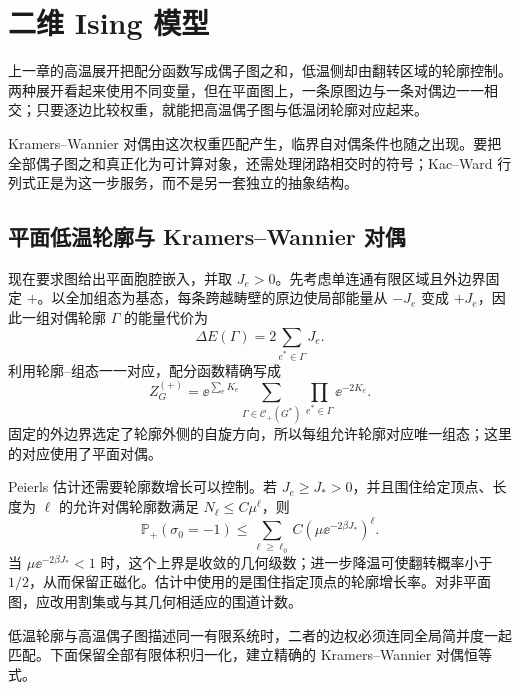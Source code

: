 \chapter{二维 Ising 模型}
\label{chap:phys-sm-high-low-temperature-duality}

上一章的高温展开把配分函数写成偶子图之和，低温侧却由翻转区域的轮廓控制。两种展开看起来使用不同变量，但在平面图上，一条原图边与一条对偶边一一相交；只要逐边比较权重，就能把高温偶子图与低温闭轮廓对应起来。

Kramers--Wannier 对偶由这次权重匹配产生，临界自对偶条件也随之出现。要把全部偶子图之和真正化为可计算对象，还需处理闭路相交时的符号；Kac--Ward 行列式正是为这一步服务，而不是另一套独立的抽象结构。

\section{平面低温轮廓与 Kramers--Wannier 对偶}
\label{sec:phys-sm-low-temp}

现在要求图给出平面胞腔嵌入，并取 \(J_e>0\)。先考虑单连通有限区域且外边界固定 \(+\)。以全加组态为基态，每条跨越畴壁的原边使局部能量从 \(-J_e\) 变成 \(+J_e\)，因此一组对偶轮廓 \(\Gamma\) 的能量代价为
\begin{equation}
 \Delta E(\Gamma)=2\sum_{e^*\in\Gamma}J_e.
 \label{eq:phys-sm-contour-energy}
\end{equation}
利用轮廓--组态一一对应，配分函数精确写成
\begin{equation}
 Z_G^{(+)}
 =\ee^{\sum_eK_e}
 \sum_{\Gamma\in\mathcal C_+(G^*)}
 \prod_{e^*\in\Gamma}\ee^{-2K_e}.
 \label{eq:phys-sm-low-temp-z}
\end{equation}
固定的外边界选定了轮廓外侧的自旋方向，所以每组允许轮廓对应唯一组态；这里的对应使用了平面对偶。

Peierls 估计还需要轮廓数增长可以控制。若 \(J_e\ge J_*>0\)，并且围住给定顶点、长度为 \(\ell\) 的允许对偶轮廓数满足 \(N_\ell\le C\mu^\ell\)，则
\begin{equation}
 \mathbb P_+(\sigma_0=-1)
 \le\sum_{\ell\ge\ell_0}
 C\left(\mu\ee^{-2\beta J_*}\right)^\ell.
 \label{eq:phys-sm-peierls-bound-general}
\end{equation}
当 $\mu\ee^{-2\beta J_*}<1$ 时，这个上界是收敛的几何级数；进一步降温可使翻转概率小于 $1/2$，从而保留正磁化。估计中使用的是围住指定顶点的轮廓增长率。对非平面图，应改用割集或与其几何相适应的围道计数。

低温轮廓与高温偶子图描述同一有限系统时，二者的边权必须连同全局简并度一起匹配。下面保留全部有限体积归一化，建立精确的 Kramers--Wannier 对偶恒等式。

